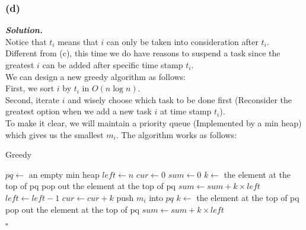 \documentclass[12pt, a4paper, UTF8]{article}
\newenvironment{solution}[1][\it{Solution}]{\textbf{#1. }\\}{\begin{flushright}$\square$\end{flushright}}
\begin{document}
        \subsubsection*{(d)}
            \begin{solution}
                Notice that $t_i$ means that $i$ can only be taken into consideration after $t_i$.\\
                Different from (c), this time we do have reasons to suspend a task since the greatest $i$ can be added after specific time stamp $t_i$.\\
                We can design a new greedy algorithm as follows:\\
                First, we sort $i$ by $t_i$ in $O(n\log{n})$.\\
                Second, iterate $i$ and wisely choose which task to be done first (Reconsider the greatest option when we add a new task $i$ at time stamp $t_i$).\\
                To make it clear, we will maintain a priority queue (Implemented by a min heap) which gives us the smallest $m_i$. The algorithm works as follows:
                \begin{algorithm}
                    \caption{Greedy}\label{alg:2}
                    $pq \gets$ an empty min heap \;
                    $left \gets n$\;
                    $cur \gets 0$\;
                    $sum \gets 0$\;
                     {
                         {
                            $k \gets$ the element at the top of pq\;
                            pop out the element at the top of pq\;
                             { 
                                $sum \gets sum + k \times left$\;
                                $left \gets left - 1$\;
                                $cur \gets cur + k$\; 
                            }
                        }
                        push $m_i$ into $pq$ 
                    }
                     {
                        $k \gets$ the element at the top of pq\;
                        pop out the element at the top of pq\;
                        $sum \gets sum + k \times left$\;
}
\end{algorithm}
\end{solution}
\end{document}
